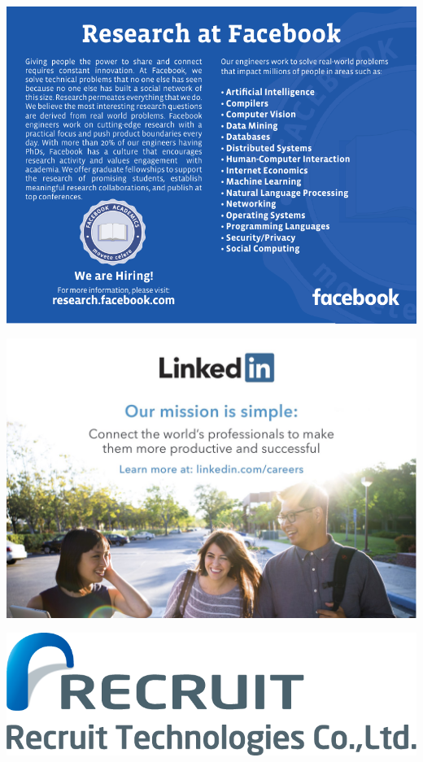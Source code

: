 \begin{center}
\includegraphics[width=1\textwidth]{content/images-web/ads/facebook}
\par\end{center}

\begin{center}
\includegraphics[width=1\textwidth]{content/images-web/ads/linkedin} 
\par\end{center}

\begin{center}
\vfill{}

\par\end{center}

\begin{center}
\includegraphics[width=1\textwidth]{content/images-web/ads/recruit}
\par\end{center}

